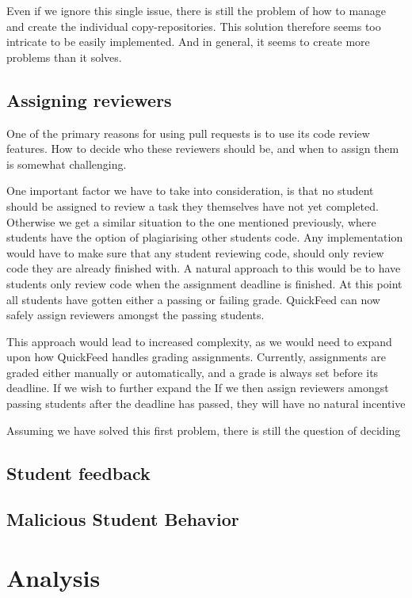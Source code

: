 Even if we ignore this single issue, there is still the problem of how to manage and create the individual copy-repositories.
This solution therefore seems too intricate to be easily implemented.
And in general, it seems to create more problems than it solves.

\subsection{Assigning reviewers}

One of the primary reasons for using pull requests is to use its code review features.
How to decide who these reviewers should be, and when to assign them is somewhat challenging.

One important factor we have to take into consideration, is that no student should be assigned to review a task they themselves have not yet completed.
Otherwise we get a similar situation to the one mentioned previously, where students have the option of plagiarising other students code.
Any implementation would have to make sure that any student reviewing code, should only review code they are already finished with.
A natural approach to this would be to have students only review code when the assignment deadline is finished.
At this point all students have gotten either a passing or failing grade.
QuickFeed can now safely assign reviewers amongst the passing students.

This approach would lead to increased complexity, as we would need to expand upon how QuickFeed handles grading assignments.
Currently, assignments are graded either manually or automatically, and a grade is always set before its deadline.
If we wish to further expand the 
If we then assign reviewers amongst passing students after the deadline has passed, they will have no natural incentive 

Assuming we have solved this first problem, there is still the question of deciding 

\subsection{Student feedback}

\subsection{Malicious Student Behavior}

\section{Analysis}

